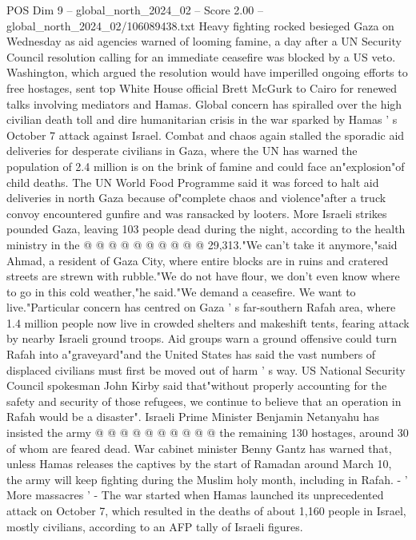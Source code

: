 \begin{textsample}{POS Dim 9 – global\_north\_2024\_02 – Score 2.00 – global\_north\_2024\_02/106089438.txt}  \label{ex:f9_pos_161}
Heavy fighting rocked besieged Gaza on Wednesday as aid agencies warned of looming famine, a day after a UN Security Council resolution calling for an immediate ceasefire was blocked by a US veto.
Washington, which argued the resolution would have imperilled ongoing efforts to free hostages, sent top White House official Brett McGurk to Cairo for renewed talks involving mediators and Hamas.
Global concern has spiralled over the high civilian death toll and dire humanitarian crisis in the war sparked by Hamas ' s October 7 attack against Israel.
Combat and chaos again stalled the sporadic aid deliveries for desperate civilians in Gaza, where the UN has warned the population of 2.4 million is on the brink of famine and could face an"explosion"of child deaths.
The UN World Food Programme said it was forced to halt aid deliveries in north Gaza because of"complete chaos and violence"after a truck convoy encountered gunfire and was ransacked by looters.
More Israeli strikes pounded Gaza, leaving 103 people dead during the night, according to the health ministry in the @ @ @ @ @ @ @ @ @ @ 29,313."We can't take it anymore,"said Ahmad, a resident of Gaza City, where entire blocks are in ruins and cratered streets are strewn with rubble."We do not have flour, we don't even know where to go in this cold weather,"he said."We demand a ceasefire.
We want to live."Particular concern has centred on Gaza ' s far-southern Rafah area, where 1.4 million people now live in crowded shelters and makeshift tents, fearing attack by nearby Israeli ground troops.
Aid groups warn a ground offensive could turn Rafah into a"graveyard"and the United States has said the vast numbers of displaced civilians must first be moved out of harm ' s way.
US National Security Council spokesman John Kirby said that"without properly accounting for the safety and security of those refugees, we continue to believe that an operation in Rafah would be a disaster".
Israeli Prime Minister Benjamin Netanyahu has insisted the army @ @ @ @ @ @ @ @ @ @ the remaining 130 hostages, around 30 of whom are feared dead.
War cabinet minister Benny Gantz has warned that, unless Hamas releases the captives by the start of Ramadan around March 10, the army will keep fighting during the Muslim holy month, including in Rafah. - ' More massacres ' - The war started when Hamas launched its unprecedented attack on October 7, which resulted in the deaths of about 1,160 people in Israel, mostly civilians, according to an AFP tally of Israeli figures.

\end{textsample}
